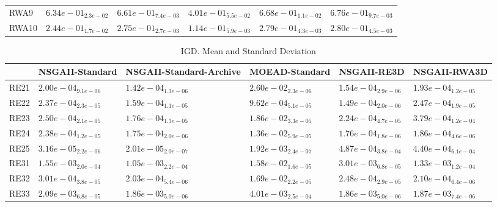 \documentclass{article}
\begin{document}
\begin{table}
\begin{scriptsize}
\begin{tabular}{llllll}
RWA9 & $  6.34e-01_{ 2.3e-02}$ & $  6.61e-01_{ 7.4e-03}$ & $  4.01e-01_{ 5.5e-02}$ & \cellcolor{gray25}$  6.68e-01_{ 1.1e-02}$ & \cellcolor{gray95}$  6.76e-01_{ 9.7e-03}$ \\
RWA10 & $  2.44e-01_{ 1.7e-02}$ & $  2.75e-01_{ 2.7e-03}$ & $  1.14e-01_{ 5.9e-03}$ & \cellcolor{gray25}$  2.79e-01_{ 4.3e-03}$ & \cellcolor{gray95}$  2.80e-01_{ 4.5e-03}$ \\
\hline
\end{tabular}
\end{scriptsize}
\end{table}

\begin{table}
\caption{IGD. Mean and Standard Deviation}
\label{table: IGD}
\centering
\begin{scriptsize}
\begin{tabular}{llllll}
\hline & NSGAII-Standard & NSGAII-Standard-Archive & MOEAD-Standard & NSGAII-RE3D &  NSGAII-RWA3D\\
\hline 
RE21 & $  2.00e-04_{ 9.1e-06}$ & \cellcolor{gray95}$  1.42e-04_{ 1.3e-06}$ & $  2.60e-02_{ 2.3e-06}$ & \cellcolor{gray25}$  1.54e-04_{ 2.9e-06}$ & $  1.93e-04_{ 1.2e-05}$ \\
RE22 & $  2.37e-04_{ 2.3e-05}$ & \cellcolor{gray25}$  1.59e-04_{ 1.1e-05}$ & $  9.62e-04_{ 5.1e-05}$ & \cellcolor{gray95}$  1.49e-04_{ 2.0e-06}$ & $  2.47e-04_{ 1.9e-05}$ \\
RE23 & $  2.50e-04_{ 2.1e-05}$ & \cellcolor{gray95}$  1.76e-04_{ 1.3e-05}$ & $  1.86e-02_{ 3.3e-05}$ & \cellcolor{gray25}$  2.24e-04_{ 4.7e-05}$ & $  3.79e-04_{ 1.2e-04}$ \\
RE24 & $  2.38e-04_{ 1.2e-05}$ & \cellcolor{gray95}$  1.75e-04_{ 2.0e-06}$ & $  1.36e-02_{ 5.9e-05}$ & \cellcolor{gray25}$  1.76e-04_{ 1.8e-06}$ & $  1.86e-04_{ 4.6e-06}$ \\
RE25 & \cellcolor{gray25}$  3.16e-05_{ 2.2e-06}$ & \cellcolor{gray95}$  2.01e-05_{ 2.0e-07}$ & $  1.92e-03_{ 2.4e-07}$ & $  4.87e-04_{ 3.8e-04}$ & $  4.40e-04_{ 6.1e-04}$ \\
RE31 & $  1.55e-03_{ 2.0e-04}$ & \cellcolor{gray95}$  1.05e-03_{ 2.2e-04}$ & $  1.58e-02_{ 1.6e-05}$ & $  3.01e-03_{ 6.8e-05}$ & \cellcolor{gray25}$  1.33e-03_{ 1.2e-04}$ \\
RE32 & $  3.01e-04_{ 3.8e-05}$ & \cellcolor{gray95}$  2.03e-04_{ 5.4e-06}$ & $  1.69e-02_{ 2.2e-05}$ & $  2.48e-04_{ 2.9e-05}$ & \cellcolor{gray25}$  2.10e-04_{ 6.4e-06}$ \\
RE33 & $  2.09e-03_{ 6.8e-05}$ & \cellcolor{gray25}$  1.86e-03_{ 5.0e-06}$ & $  4.01e-03_{ 2.5e-04}$ & \cellcolor{gray95}$  1.86e-03_{ 5.0e-06}$ & $  1.87e-03_{ 7.4e-06}$ \\

\end{tabular}
\end{scriptsize}
\end{table}
\end{document}
